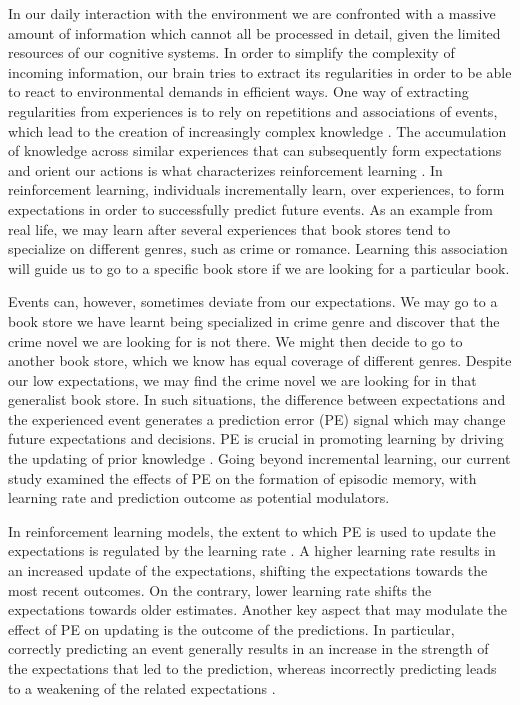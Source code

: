 \documentclass[a4paper,12pt]{article}
\begin{document}

In our daily interaction with the environment we are confronted with a massive amount of information which cannot all be processed in detail, given the limited resources of our cognitive systems. In order to simplify the complexity of incoming information, our brain tries to extract its regularities in order to be able to react to environmental demands in efficient ways. One way of extracting regularities from experiences is to rely on repetitions and associations of events, which lead to the creation of increasingly complex knowledge \citep{Ghosh2014, Tse2007}. The accumulation of knowledge across similar experiences that can subsequently form expectations and orient our actions is what characterizes reinforcement learning \citep{Sutton1998}. In reinforcement learning, individuals incrementally learn, over experiences, to form expectations in order to successfully predict future events. As an example from real life, we may learn after several experiences that book stores tend to specialize on different genres, such as crime or romance. Learning this association will guide us to go to a specific book store if we are looking for a particular book. \par 
Events can, however, sometimes deviate from our expectations. We may go to a book store we have learnt being specialized in crime genre and discover that the crime novel we are looking for is not there. We might then decide to go to another book store, which we know has equal coverage of different genres. Despite our low expectations, we may find the crime novel we are looking for in that generalist book store. In such situations, the difference between expectations and the experienced event generates a prediction error (PE) signal which may change future expectations and decisions. PE is crucial in promoting learning by driving the updating of prior knowledge \citep{Ergo2020, Friston2018}. Going beyond incremental learning, our current study examined the effects of PE on the formation of episodic memory, with learning rate and prediction outcome as potential modulators. 
\par In reinforcement learning models, the extent to which PE is used to update the expectations is regulated by the learning rate \citep{Sutton2018a}. A higher learning rate results in an increased update of the expectations, shifting the expectations towards the most recent outcomes. On the contrary, lower learning rate shifts the expectations towards older estimates. Another key aspect that may modulate the effect of PE on updating is the outcome of the predictions. In particular, correctly predicting an event generally results in an increase in the strength of the expectations that led to the prediction, whereas incorrectly predicting leads to a weakening of the related expectations  \citep{Daw2013}. %
\end{document}
